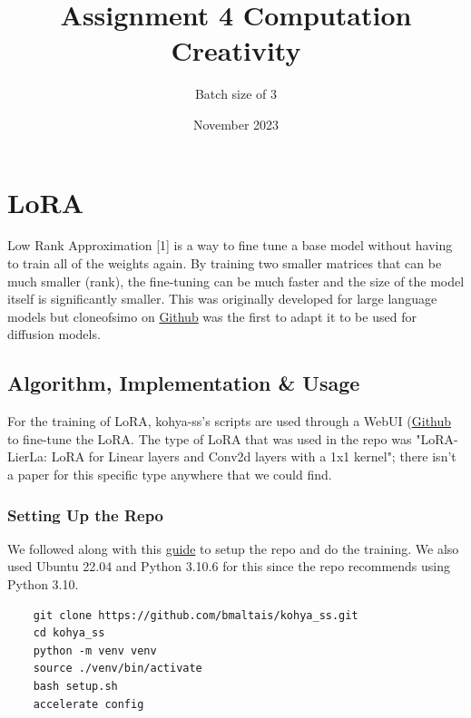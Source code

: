 \documentclass{article}
\title{Assignment 4 Computation Creativity}
\author{Batch size of 3}
\date{November 2023}
\begin{document}
\maketitle




\section{LoRA}
Low Rank Approximation [1] is a way to fine tune a base model without having to train all of the weights again. By training two smaller matrices that can be much smaller (rank), the fine-tuning can be much faster and the size of the model itself is significantly smaller. This was originally developed for large language models but cloneofsimo on \href{https://github.com/cloneofsimo/lora}{Github} was the first to adapt it to be used for diffusion models.

\subsection{Algorithm, Implementation \& Usage}
For the training of LoRA, kohya-ss's scripts are used through a WebUI (\href{https://github.com/bmaltais/kohya_ss}{Github} to fine-tune the LoRA. The type of LoRA that was used in the repo was "LoRA-LierLa: LoRA for Linear layers and Conv2d layers with a 1x1 kernel"; there isn't a paper for this specific type anywhere that we could find.

\subsubsection{Setting Up the Repo}
We followed along with this \href{https://rentry.org/ezlora}{guide} to setup the repo and do the training. We also used Ubuntu 22.04 and Python 3.10.6 for this since the repo recommends using Python 3.10.
\begin{verbatim}
    git clone https://github.com/bmaltais/kohya_ss.git
    cd kohya_ss
    python -m venv venv
    source ./venv/bin/activate
    bash setup.sh
    accelerate config
\end{verbatim}
\end{document}

